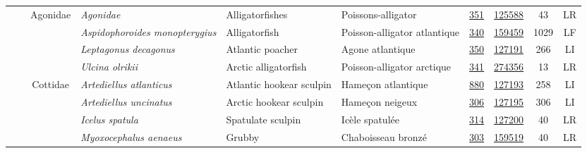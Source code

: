 \documentclass[12pt]{article}\usepackage[]{graphicx}\usepackage[]{color}
\begin{document}
\begin{landscapepage}
\begin{longtable}[t]{ccc>{\centering\arraybackslash}p{3cm}>{\centering\arraybackslash}p{3cm}>{\centering\arraybackslash}p{3cm}>{}c>{}ccc}
\hspace{1em}\hspace{1em} &  & Agonidae & \em{Agonidae} & Alligatorfishes & Poissons-alligator & \href{#sec:625}{351} & \href{http://www.marinespecies.org/aphia.php?p=taxdetails&id=159821}{125588} & 43 & LR\\
\hspace{1em}\hspace{1em} &  &  & \em{Aspidophoroides monopterygius} & Alligatorfish & Poisson-alligator atlantique & \href{#sec:626}{340} & \href{http://www.marinespecies.org/aphia.php?p=taxdetails&id=159817}{159459} & 1029 & LF\\
\hspace{1em}\hspace{1em} &  &  & \em{Leptagonus decagonus} & Atlantic poacher & Agone atlantique & \href{#sec:630}{350} & \href{http://www.marinespecies.org/aphia.php?p=taxdetails&id=159675}{127191} & 266 & LI\\
\hspace{1em}\hspace{1em} &  &  & \em{Ulcina olrikii} & Arctic alligatorfish & Poisson-alligator arctique & \href{#sec:637}{341} & \href{http://www.marinespecies.org/aphia.php?p=taxdetails&id=276339}{274356} & 13 & LR\\
\hspace{1em}\hspace{1em} &  & Cottidae & \em{Artediellus atlanticus} & Atlantic hookear sculpin & Hameçon atlantique & \href{#sec:640}{880} & \href{http://www.marinespecies.org/aphia.php?p=taxdetails&id=159267}{127193} & 258 & LI\\
\hspace{1em}\hspace{1em} &  &  & \em{Artediellus uncinatus} & Arctic hookear sculpin & Hameçon neigeux & \href{#sec:641}{306} & \href{http://www.marinespecies.org/aphia.php?p=taxdetails&id=127112}{127195} & 306 & LI\\
\hspace{1em}\hspace{1em} &  &  & \em{Icelus spatula} & Spatulate sculpin & Icèle spatulée & \href{#sec:646}{314} & \href{http://www.marinespecies.org/aphia.php?p=taxdetails&id=127120}{127200} & 40 & LR\\
\hspace{1em}\hspace{1em} &  &  & \em{Myoxocephalus aenaeus} & Grubby & Chaboisseau bronzé & \href{#sec:647}{303} & \href{http://www.marinespecies.org/aphia.php?p=taxdetails&id=127118}{159519} & 40 & LR\\

\end{longtable}
\end{landscapepage}
\end{document}
